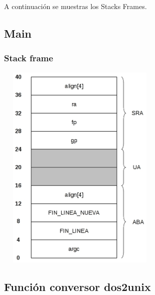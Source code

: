 \documentclass[a4paper,10pt]{article}
\begin{document}
  A continuaci\'on se muestras los Stacks Frames.

  \subsection{Main}
    \subsubsection{Stack frame}
      \begin{center}
	\includegraphics[width=8cm, height=10cm]{DibujosStackFrame/stack-main.jpg}
      \end{center}

  \subsection{Funci\'on conversor dos2unix}
\end{document}
